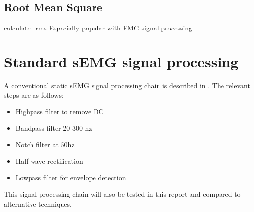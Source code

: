 \subsection{Root Mean Square}
calculate_rms
Especially popular with EMG signal processing.


\section{Standard sEMG signal processing}
A conventional static sEMG signal processing chain is described in \cite{muscle_force_estimation}. The relevant steps are as follows:
\begin{itemize}
    \item Highpass filter to remove DC
    \item Bandpass filter 20-300 hz
    \item Notch filter at 50hz
    \item Half-wave rectification
    \item Lowpass filter for envelope detection
\end{itemize}

This signal processing chain will also be tested in this report and compared to alternative techniques.